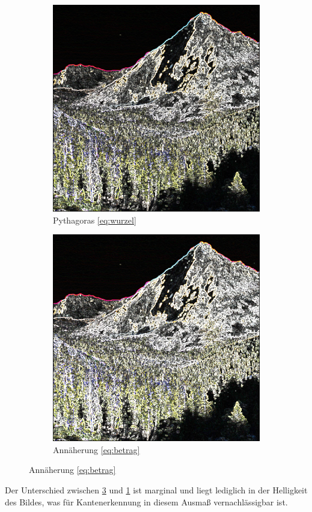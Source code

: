 \documentclass[course=erap]{aspdoc}
\begin{document}
\begin{figure}[H]
    \begin{subfigure}{.5\columnwidth}
        \centering
        \includegraphics[width=\columnwidth]{graphics/sqrt_sobel.png}
        \caption{Pythagoras \ref{eq:wurzel}}
        \label{fig:sqrt-bild}
    \end{subfigure}
    \begin{subfigure}{.5\columnwidth}
        \centering
        \includegraphics[width=\columnwidth]{graphics/johnmuirtrail_sobel.png}
        \caption{Annäherung \ref{eq:betrag}}
        \label{fig:abs-bild}
    \end{subfigure}
\end{figure}
Der Unterschied zwischen \ref{fig:abs-bild} und \ref{fig:sqrt-bild} ist marginal und liegt lediglich in der Helligkeit des Bildes, was für Kantenerkennung in diesem Ausmaß vernachlässigbar ist.
\end{document}
